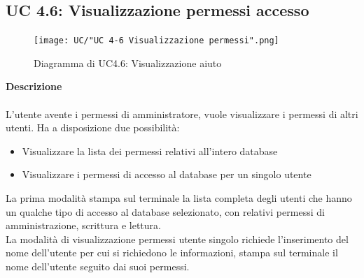 \documentclass[a4paper]{article}
\begin{document}
		 \subsection{UC 4.6: Visualizzazione permessi accesso}
	 \begin{figure}[H]
				\centering
				\texttt{[image: UC/"UC 4-6 Visualizzazione permessi".png]}
				\caption{Diagramma di UC4.6: Visualizzazione aiuto}
			\end{figure}
	\textbf{Descrizione} 
	\\ \\
L'utente avente i permessi di amministratore, vuole visualizzare i permessi di altri utenti. Ha a disposizione due possibilità: 
	\begin{itemize}
		\item Visualizzare la lista dei permessi relativi all'intero database
		\item Visualizzare i permessi di accesso al database per un singolo utente
	\end{itemize}
	La prima modalità stampa sul terminale la lista completa degli utenti che hanno un qualche tipo di accesso al database selezionato, con relativi permessi di amministrazione, scrittura e lettura. \\
	La modalità di visualizzazione permessi utente singolo richiede l'inserimento del nome dell'utente per cui si richiedono le informazioni, stampa sul terminale il nome dell'utente seguito dai suoi permessi.
\end{document}
